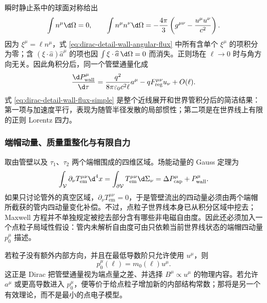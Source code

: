 瞬时静止系中的球面对称给出
\begin{equation}
 \int n^\mu\d\Omega=0,
 \qquad
 \int n^\mu n^\nu\d\Omega
 =-{4\pi\over3}
 \left(g^{\mu\nu}-{u^\mu u^\nu\over c^2}\right).
 \label{eq:dirac-detail-angular-identities}
\end{equation}
因为 $\xi^\mu=\ell n^\mu$，式 \eqref{eq:dirac-detail-wall-angular-flux} 中所有含单个 $\xi^\mu$ 的项积分为零；含 $(\xi\cdot \widehat a)\widehat a^\mu$ 的项也因 $\int\xi\cdot \widehat a\,\d\Omega=0$ 而消失。正则场在 $\ell\to0$ 时与角方向无关。因此角积分后，同一个管壁通量化成
\begin{equation}
 {\d P_{\mathrm{wall}}^\mu\over\d\tau}
 ={q^2\over8\pi\varepsilon_0c^2\ell}a^\mu
 -qF_{\mathrm{reg}}^{\mu\nu}u_\nu
 +O(\ell).
 \label{eq:dirac-detail-wall-flux-simple}
\end{equation}
式 \eqref{eq:dirac-detail-wall-flux-simple} 是整个近线展开和世界管积分后的简洁结果：第一项与加速度平行，表现为随管半径发散的局部惯性；第二项是在世界线上有限的正则 Lorentz 四力。

\subsubsection{端帽动量、质量重整化与有限自力}

取由管壁以及 $\tau_1$、$\tau_2$ 两个端帽围成的四维区域。场能动量的 Gauss 定理为
\begin{equation}
 \int_{\mathcal V}\partial_\nu T_{\mathrm{em}}^{\mu\nu}\d^4x
 =\int_{\partial\mathcal V}T_{\mathrm{em}}^{\mu\nu}\d\Sigma_\nu
 =\Delta P_{\mathrm{cap}}^\mu+P_{\mathrm{wall}}^\mu.
 \label{eq:dirac-detail-worldtube-gauss}
\end{equation}
如果只讨论管外的真空区域，$\partial_\nu T_{\mathrm{em}}^{\mu\nu}=0$，于是管壁流出的四动量必须由两个端帽所截获的管内四动量变化补偿。不过，点粒子世界线本身已从积分区域中挖去；Maxwell 方程并不单独规定被挖去部分含有哪些非电磁自由度。因此还必须加入一个点粒子局域性假设：管内未解析自由度可由只依赖当前世界线状态的端帽四动量 $p_0^\mu$ 描述。

若粒子没有额外内部方向，并且在最低导数阶只允许使用 $u^\mu$，则
\begin{equation}
 p_0^\mu(\ell)=m_0(\ell)u^\mu.
 \label{eq:dirac-detail-bare-momentum}
\end{equation}
这正是 Dirac 把管壁通量视为端点量之差、并选择 $B^\mu\propto u^\mu$ 的物理内容。若允许 $a^\mu$ 或更高导数进入 $p_0^\mu$，便等价于给点粒子增加新的内部结构常数；那将是另一个有效理论，而不是最小的点电子模型。

